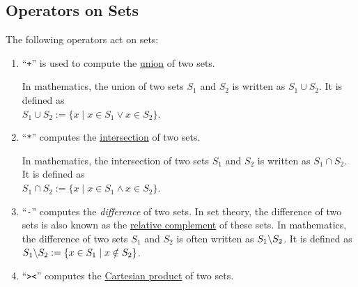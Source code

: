 \subsection{Operators on Sets}
The following operators act on sets:
\begin{enumerate}
\item ``\texttt{+}'' is used to compute the \href{https://en.wikipedia.org/wiki/Union_(set_theory)}{union} of two sets.

      In mathematics, the union of two sets $S_1$ and $S_2$ is  written
      as $S_1 \cup S_2$.  It is defined as
      \\[0.2cm]
      \hspace*{1.3cm}
      $S_1 \cup S_2 := \{ x \mid x \in S_1 \vee x \in  S_2 \}$.
\item ``\texttt{*}'' computes the \href{https://en.wikipedia.org/wiki/Intersection_(set_theory)}{intersection} of two sets. 

      In mathematics, the intersection of two sets $S_1$ and $S_2$ is  written
      as $S_1 \cap S_2$.  It is defined as
      \\[0.2cm]
      \hspace*{1.3cm}
      $S_1 \cap S_2 := \{ x \mid x \in S_1 \wedge x \in  S_2 \}$.
\item ``\texttt{-}'' computes the \emph{difference} of two sets.  In set theory, the difference of two sets is
      also known as the
      \href{https://en.wikipedia.org/wiki/Complement_(set_theory)#Relative_complement}{relative complement} of
      these sets.  In mathematics, the difference of two sets $S_1$ and $S_2$ is often written
      as $S_1 \symbol{92} S_2$.  It is defined as
      \\[0.2cm]
      \hspace*{1.3cm}
      $S_1 \symbol{92} S_2 := \{ x \in S_1 \mid x \notin S_2 \}$.
\item ``\texttt{><}'' computes the \href{https://en.wikipedia.org/wiki/Cartesian_product}{Cartesian product} of two sets.


\end{enumerate}
